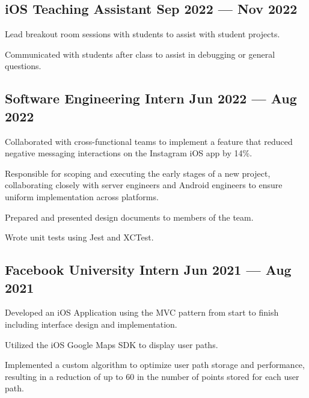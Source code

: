 
\subsection{{iOS Teaching Assistant \hfill Sep 2022 --- Nov 2022}}
\begin{zitemize}
\item Lead breakout room sessions with students to assist with student projects.
\item Communicated with students after class to assist in debugging or general questions.

\end{zitemize}


\subsection{{Software Engineering Intern \hfill Jun 2022 --- Aug 2022}}
\begin{zitemize}
\item Collaborated with cross-functional teams to implement a feature that reduced negative messaging interactions on the Instagram iOS app by 14\%.
\item Responsible for scoping and executing the early stages of a new project, collaborating closely with server engineers and Android engineers to ensure uniform implementation across platforms.
\item Prepared and presented design documents to members of the team.
\item Wrote unit tests using Jest and XCTest.
\end{zitemize}

\subsection{{Facebook University Intern \hfill Jun 2021 --- Aug 2021}}
\begin{zitemize}
\item Developed an iOS Application using the MVC pattern from start to finish including interface design and implementation.
\item Utilized the iOS Google Maps SDK to display user paths.
\item Implemented a custom algorithm to optimize user path storage and performance, resulting in a reduction of up to 60 in the number of points stored for each user path.
\end{zitemize}

